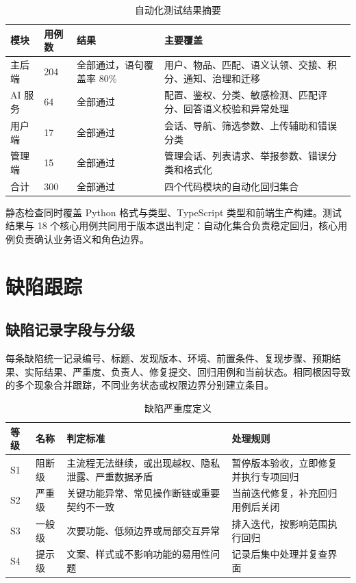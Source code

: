 \begin{table}[H]
  \centering
  \caption{自动化测试结果摘要}\label{tab:test-results}
  \begin{tabularx}{\textwidth}{L{2.8cm}C{2.2cm}L{3.5cm}Y}
    \toprule
    模块 & 用例数 & 结果 & 主要覆盖 \\
    \midrule
    主后端 & 204 & 全部通过，语句覆盖率 80\% & 用户、物品、匹配、语义认领、交接、积分、通知、治理和迁移 \\
    AI 服务 & 64 & 全部通过 & 配置、鉴权、分类、敏感检测、匹配评分、回答语义校验和异常处理 \\
    用户端 & 17 & 全部通过 & 会话、导航、筛选参数、上传辅助和错误分类 \\
    管理端 & 15 & 全部通过 & 管理会话、列表请求、举报参数、错误分类和格式化 \\
    \midrule
    合计 & 300 & 全部通过 & 四个代码模块的自动化回归集合 \\
    \bottomrule
  \end{tabularx}
\end{table}

静态检查同时覆盖 Python 格式与类型、TypeScript 类型和前端生产构建。测试结果与 18 个核心用例共同用于版本退出判定：自动化集合负责稳定回归，核心用例负责确认业务语义和角色边界。

\section{缺陷跟踪}

\subsection{缺陷记录字段与分级}

每条缺陷统一记录编号、标题、发现版本、环境、前置条件、复现步骤、预期结果、实际结果、严重度、负责人、修复提交、回归用例和当前状态。相同根因导致的多个现象合并跟踪，不同业务状态或权限边界分别建立条目。

\begin{table}[H]
  \centering
  \caption{缺陷严重度定义}
  \begin{tabularx}{\textwidth}{L{1.8cm}L{3.1cm}Y L{3.0cm}}
    \toprule
    等级 & 名称 & 判定标准 & 处理规则 \\
    \midrule
    S1 & 阻断级 & 主流程无法继续，或出现越权、隐私泄露、严重数据矛盾 & 暂停版本验收，立即修复并执行专项回归 \\
    S2 & 严重级 & 关键功能异常、常见操作断链或重要契约不一致 & 当前迭代修复，补充回归用例后关闭 \\
    S3 & 一般级 & 次要功能、低频边界或局部交互异常 & 排入迭代，按影响范围执行回归 \\
    S4 & 提示级 & 文案、样式或不影响功能的易用性问题 & 记录后集中处理并复查界面 \\
    \bottomrule
  \end{tabularx}
\end{table}

